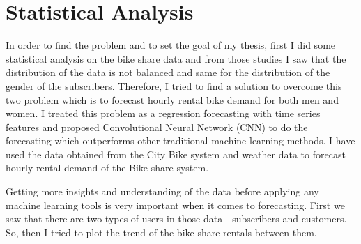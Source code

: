 \section {Statistical Analysis}
\label{statistics}

In order to find the problem and to set the goal of my thesis, first I did some statistical analysis on the bike share data and from those studies I saw that the distribution of the data is not balanced and same for the distribution of the gender of the subscribers. Therefore, I tried to find a solution to overcome this two problem which is to forecast hourly rental bike demand for both men and women. I treated this problem as a regression forecasting with time series features and proposed Convolutional Neural Network (CNN) to do the forecasting which outperforms other traditional machine learning methods. I have used the data obtained from the City Bike system and weather data to forecast hourly rental demand of the Bike share system.


Getting more insights and understanding of the data before applying any machine learning tools is very important when it comes to forecasting. First we saw that there are two types of users in those data - subscribers and customers. So, then I tried to plot the trend of the bike share rentals between them. 


\begin{figure}
\centering
{}
\end{figure}

